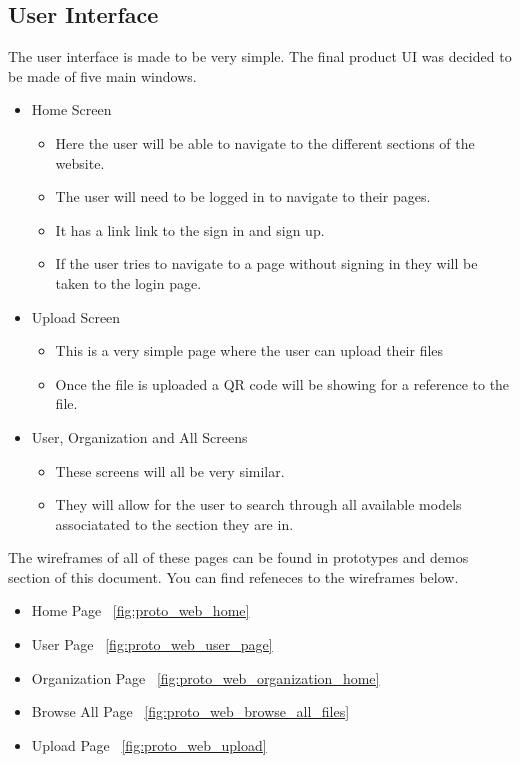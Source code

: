 \subsection{User Interface}
The user interface is made to be very simple. The final product
UI was decided to be made of five main windows. 
\begin{itemize}
    \item Home Screen
    \begin{itemize}
        \item Here the user will be able to navigate to the different sections of the website.
        \item The user will need to be logged in to navigate to their pages.
        \item It has a link link to the sign in and sign up.
        \item If the user tries to navigate to a page without signing in
        they will be taken to the login page.
    \end{itemize}

    \item Upload Screen
    \begin{itemize}
        \item This is a very simple page where the user can upload their files
        \item Once the file is uploaded a QR code will be showing for a reference to the file.
    \end{itemize}

    \item User, Organization and All Screens
    \begin{itemize}
        \item These screens will all be very similar.
        \item They will allow for the user to search through all
        available models associatated to the section they are in.
    \end{itemize}
\end{itemize}

The wireframes of all of these pages can be found in prototypes and demos section of this document.
You can find refeneces to the wireframes below.
\begin{itemize}
    \item Home Page ~\ref{fig:proto_web_home}
    \item User Page ~\ref{fig:proto_web_user_page}
    \item Organization Page ~\ref{fig:proto_web_organization_home}
    \item Browse All Page ~\ref{fig:proto_web_browse_all_files}
    \item Upload Page ~\ref{fig:proto_web_upload}
\end{itemize}

